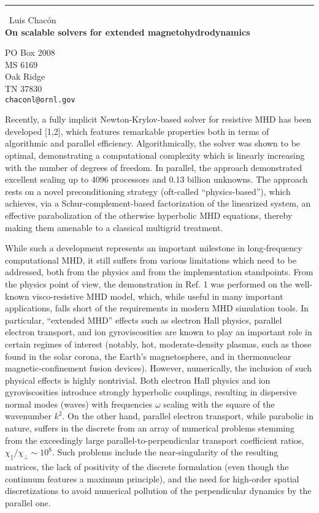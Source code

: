 \documentclass{report}
\begin{document}
\begin{center}
\rule{6in}{1pt} \
{\large Luis Chac\'on \\
{\bf On scalable solvers for extended magnetohydrodynamics}}

PO Box 2008 \\ MS 6169 \\ Oak Ridge \\ TN 37830
\\
{\tt chaconl@ornl.gov}\end{center}

Recently, a fully implicit Newton-Krylov-based solver for resistive
MHD has been developed {[}1,2{]}, which features remarkable properties
both in terms of algorithmic and parallel efficiency. Algorithmically,
the solver was shown to be optimal, demonstrating a computational
complexity which is linearly increasing with the number of degrees
of freedom. In parallel, the approach demonstrated excellent scaling
up to 4096 processors and 0.13 billion unknowns. The approach rests
on a novel preconditioning strategy (oft-called ``physics-based''),
which achieves, via a Schur-complement-based factorization of the
linearized system, an effective parabolization of the otherwise hyperbolic
MHD equations, thereby making them amenable to a classical multigrid
treatment.

While such a development represents an important milestone in long-frequency
computational MHD, it still suffers from various limitations which
need to be addressed, both from the physics and from the implementation
standpoints. From the physics point of view, the demonstration in
Ref. 1 was performed on the well-known visco-resistive MHD model,
which, while useful in many important applications, falls short of
the requirements in modern MHD simulation tools. In particular, ``extended
MHD'' effects such as electron Hall physics, parallel electron transport,
and ion gyroviscosities are known to play an important role in certain
regimes of interest (notably, hot, moderate-density plasmas, such
as those found in the solar corona, the Earth's magnetosphere, and
in thermonuclear magnetic-confinement fusion devices). However, numerically,
the inclusion of such physical effects is highly nontrivial. Both
electron Hall physics and ion gyroviscosities introduce strongly hyperbolic
couplings, resulting in dispersive normal modes (waves) with frequencies
$\omega$ scaling with the square of the wavenumber $k^{2}$. On the
other hand, parallel electron transport, while parabolic in nature,
suffers in the discrete from an array of numerical problems stemming
from the exceedingly large parallel-to-perpendicular transport coefficient
ratios, $\chi_{\parallel}/\chi_{\perp}\sim10^{8}$. Such problems
include the near-singularity of the resulting matrices, the lack of
positivity of the discrete formulation (even though the continuum
features a maximum principle), and the need for high-order spatial
discretizations to avoid numerical pollution of the perpendicular
dynamics by the parallel one.
\end{document}
